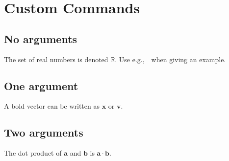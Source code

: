 \documentclass[11pt]{article}
\newcommand{\R}{\mathbb{R}}
\newcommand{\eg}{e.g.,\ }
\newcommand{\vecbold}[1]{\mathbf{#1}}
\newcommand{\dotprod}[2]{#1 \cdot #2}
\begin{document}
\section{Custom Commands}

\subsection{No arguments}
The set of real numbers is denoted $\R$.
Use \eg\ when giving an example.

\subsection{One argument}
A bold vector can be written as $\vecbold{x}$ or $\vecbold{v}$.

\subsection{Two arguments}
The dot product of $\vecbold{a}$ and $\vecbold{b}$ is
$\dotprod{\vecbold{a}}{\vecbold{b}}$.
\end{document}
